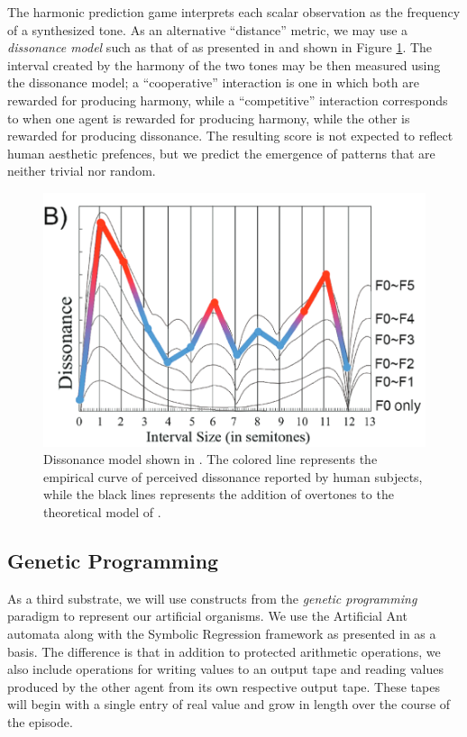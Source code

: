 \documentclass{article}
\begin{document}
The harmonic prediction game interprets each scalar observation as the frequency of a 
synthesized tone. As an alternative ``distance'' metric, we may use a \textit{dissonance model}
such as that of \citet{sethares2005}
as presented in \citet{cook2017} and shown in Figure \ref{cook}. The interval created by the harmony of the two tones 
may be then measured using the dissonance model; a ``cooperative''
interaction is one in which both are rewarded for producing harmony, 
while a ``competitive'' interaction corresponds
to when one agent is rewarded for producing harmony, while the other is 
rewarded for producing dissonance. The resulting score is not expected to reflect human aesthetic
prefences, but we predict the emergence of patterns that are neither trivial nor random.

\begin{figure}[H]
    \begin{center}
        \includegraphics[width=4.5in]{cook.png}
        \caption{Dissonance model shown in \citet{cook2017}. The colored line represents the 
        empirical curve of perceived dissonance reported by human subjects, while the black 
        lines represents the addition of 
        overtones to the theoretical model of \citet{sethares2005}.}
        \label{cook}
    \end{center}
\end{figure}

\subsection*{Genetic Programming}
As a third substrate, we will use constructs from the \textit{genetic programming}
paradigm to represent our artificial organisms. We use the Artificial Ant automata 
along with the Symbolic Regression framework as presented 
in \citet{koza2005} as a basis. The difference is that in addition to protected arithmetic operations,
we also include operations for writing values to an output tape and reading values produced by
the other agent from its own respective output tape. These tapes will begin with a single entry
of real value and grow in length over the course of the episode.
\end{document}
